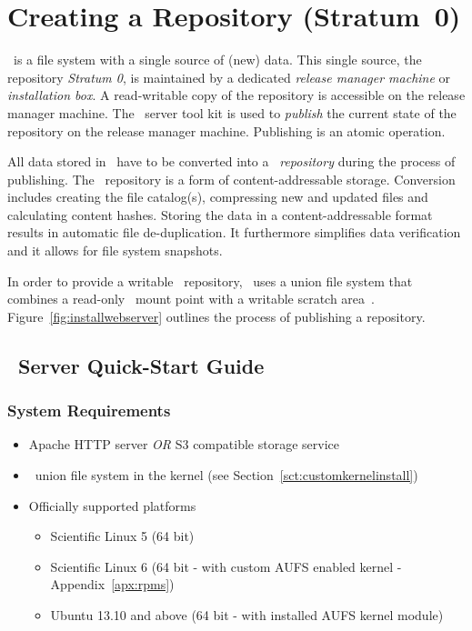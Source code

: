 \chapter{Creating a Repository (Stratum~0)}
\label{sct:createrepo}


\cvmfs\ is a file system with a single source of (new) data.
This single source, the repository \emph{Stratum 0}, is maintained by a dedicated \emph{release manager machine} or \emph{installation box}.
A read-writable copy of the repository is accessible on the release manager machine.
The \cvmfs\ server tool kit is used to \emph{publish} the current state of the repository on the release manager machine.
Publishing is an atomic operation.

All data stored in \cvmfs\ have to be converted into a \cvmfs\ \emph{repository} during the process of publishing.
The \cvmfs\ repository is a form of content-addressable storage.
Conversion includes creating the file catalog(s), compressing new and updated files and calculating content hashes.
Storing the data in a content-addressable format results in automatic file de-duplication.
It furthermore simplifies data verification and it allows for file system snapshots.

In order to provide a writable \cvmfs\ repository, \cvmfs\ uses a union file system that combines a read-only \cvmfs\ mount point with a writable scratch area~\cite{unionfs04,aufs}.
Figure~\ref{fig:installwebserver} outlines the process of publishing a repository.

\pagebreak

\section{\cvmfs\ Server Quick-Start Guide}
\label{sct:quickstart}

\subsection{System Requirements}
\begin{itemize}
\item Apache HTTP server \emph{OR} S3 compatible storage service
\item \aufs\ union file system in the kernel (see Section~\ref{sct:customkernelinstall})
\item Officially supported platforms
\begin{itemize}
    \item Scientific Linux 5 (64 bit)
    \item Scientific Linux 6 (64 bit - with custom AUFS enabled kernel - Appendix~\ref{apx:rpms})
    \item Ubuntu 13.10 and above (64 bit - with installed AUFS kernel module)
\end{itemize}
\end{itemize}

